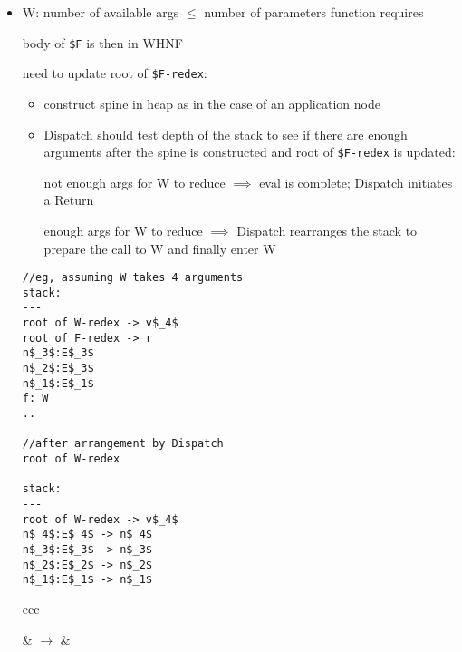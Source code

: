 \documentclass[8pt]{extarticle}
\begin{document}
\begin{multicols*}{2}
\begin{itemize}
\item W: number of available args $\leq$ number of parameters function requires

  body of \verb|$F| is then in WHNF

  need to update root of \verb|$F-redex|:

  \begin{itemize}

    \item construct spine in heap as in the case of an application node

    \item Dispatch should test depth of the stack to see if there are enough arguments after the spine is constructed and root of \verb|$F-redex| is updated:

      not enough args for W to reduce $\implies$  eval is complete; Dispatch initiates a Return

      enough args for W to reduce $\implies$ Dispatch rearranges the stack to prepare the call to W and finally enter W
    \end{itemize}

    \begin{lstlisting}
//eg, assuming W takes 4 arguments
stack:
---
root of W-redex -> v$_4$
root of F-redex -> r
n$_3$:E$_3$
n$_2$:E$_3$
n$_1$:E$_1$
f: W
..

//after arrangement by Dispatch
root of W-redex

stack:
---
root of W-redex -> v$_4$
n$_4$:E$_4$ -> n$_4$
n$_3$:E$_3$ -> n$_3$
n$_2$:E$_2$ -> n$_2$
n$_1$:E$_1$ -> n$_1$
    \end{lstlisting}
    
\begin{tblr}{ccc}
 &
$\rightarrow$ &
\end{tblr}


\end{itemize}
\end{multicols*}
\end{document}
